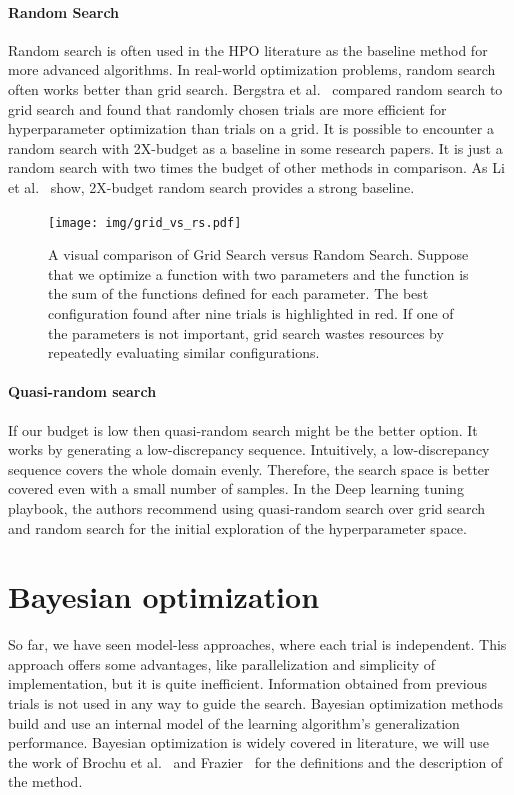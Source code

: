 \paragraph{Random Search} Random search is often used in the HPO literature as the baseline method for more advanced algorithms. In real-world optimization problems, random search often works better than grid search. Bergstra et al.~\cite{bergstra2012random} compared random search to grid search and found that randomly chosen trials are more efficient for hyperparameter optimization than trials on a grid. It is possible to encounter a random search with 2X-budget as a baseline in some research papers. It is just a random search with two times the budget of other methods in comparison. As Li et al.~\cite{li2018hyperband} show, 2X-budget random search provides a strong baseline.

\begin{figure}[H]
    \centering
    \texttt{[image: img/grid\_vs\_rs.pdf]}
    \caption{A visual comparison of Grid Search versus Random Search. Suppose that we optimize a function with two parameters and the function is the sum of the functions defined for each parameter. The best configuration found after nine trials is highlighted in red. If one of the parameters is not important, grid search wastes resources by repeatedly evaluating similar configurations. }
    \label{fig:grid}
\end{figure}

\paragraph{Quasi-random search} If our budget is low then quasi-random search might be the better option. It works by generating a low-discrepancy sequence. Intuitively, a low-discrepancy sequence covers the whole domain evenly. Therefore, the search space is better covered even with a small number of samples. In the Deep learning tuning playbook, the authors recommend using quasi-random search over grid search and random search for the initial exploration of the hyperparameter space.



\section{Bayesian optimization}
So far, we have seen model-less approaches, where each trial is independent. This approach offers some advantages, like parallelization and simplicity of implementation, but it is quite inefficient. Information obtained from previous trials is not used in any way to guide the search. Bayesian optimization methods build and use an internal model of the learning algorithm's generalization performance. Bayesian optimization is widely covered in literature, we will use the work of Brochu et al.~\cite{brochu2010tutorial} and Frazier~\cite{frazier2018tutorial} for the definitions and the description of the method.

